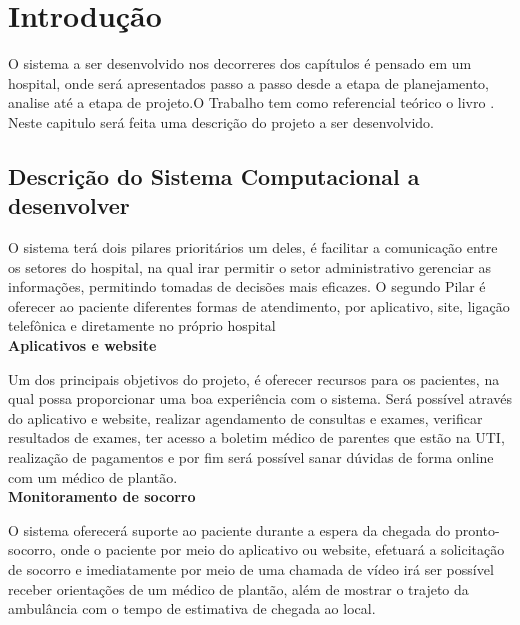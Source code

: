 

\chapter{ Introdu\c{c}\~{a}o}


O sistema a ser desenvolvido nos decorreres dos capítulos é pensado em um hospital, onde      será apresentados passo a passo desde a etapa de planejamento, analise até a etapa de projeto.O Trabalho tem como referencial teórico o livro \cite{Dennis2014}.
Neste capitulo será feita uma descrição do projeto a ser desenvolvido. 



 \section{Descri\c{c}\~{a}o do Sistema Computacional a desenvolver}

O sistema terá dois pilares prioritários um deles, é facilitar a comunicação entre os setores do hospital, na qual irar permitir o setor administrativo gerenciar as informações, permitindo tomadas de decisões mais eficazes. O segundo Pilar é oferecer ao paciente diferentes formas de atendimento, por aplicativo, site, ligação telefônica e diretamente no próprio hospital \\

\textbf{Aplicativos e website} 

Um dos principais objetivos do projeto, é oferecer recursos para os pacientes, na qual possa proporcionar uma boa experiência com o sistema. Será possível através do aplicativo e website, realizar agendamento de consultas e exames, verificar resultados de exames, ter acesso a boletim médico de parentes que estão na UTI, realização de pagamentos e por fim será possível sanar dúvidas de forma online com um médico de plantão. \\


\textbf{Monitoramento de socorro} 

O sistema oferecerá suporte ao paciente durante a espera da chegada do pronto-socorro, onde o paciente por meio do aplicativo ou website, efetuará a solicitação  de socorro e imediatamente por meio de uma chamada de vídeo irá ser possível receber orientações de um médico de plantão, além de mostrar o trajeto da ambulância com o tempo de estimativa de chegada ao local. \\

